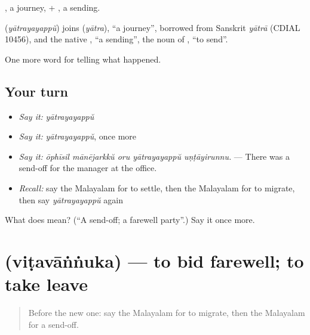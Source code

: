 , a journey, + , a sending.

\begin{cousinweb}
\textbf{} (\emph{yātrayayappŭ}) joins  (\emph{yātra}), \textquotedblleft{}a journey\textquotedblright{}, borrowed from Sanskrit \emph{yātrā} (CDIAL 10456), and the native , \textquotedblleft{}a sending\textquotedblright{}, the noun of , \textquotedblleft{}to send\textquotedblright{}.
\end{cousinweb}

\begin{grammarlens}[title={What you've built}]
One more word for telling what happened.
\end{grammarlens}

\subsection*{Your turn}
\begin{itemize}
\raggedright
  \item \emph{Say it:} \emph{yātrayayappŭ}
  \item \emph{Say it:} \emph{yātrayayappŭ}, once more
  \item \emph{Say it:} \emph{ōphīsil mānējarkkŭ oru yātrayayappŭ uṇṭāyirunnu.} — There was a send-off for the manager at the office.
  \item \emph{Recall:} say the Malayalam for to settle, then the Malayalam for to migrate, then say \emph{yātrayayappŭ} again
\end{itemize}

\begin{tcolorbox}[breakable,colback=teal!4,colframe=teal!35!black,title={Before you move on}]
What does  mean? (\textquotedblleft{}A send-off; a farewell party\textquotedblright{}.) Say it once more.
\end{tcolorbox}
\section[\texorpdfstring{\ml{വിടവാങ്ങുക} (viṭavāṅṅuka)}{വിടവാങ്ങുക (viṭavāṅṅuka)}]{ (viṭavāṅṅuka) — to bid farewell; to take leave}

\label{lesson:ML-C390-vitavannuka}



\begin{quote}
Before the new one: say the Malayalam for to migrate, then the Malayalam for a send-off.
\end{quote}

